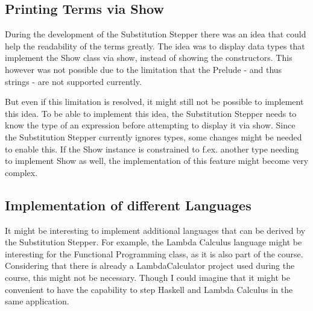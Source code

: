 \subsection{Printing Terms via Show}
During the development of the Substitution Stepper there was an idea that could help the readability of the terms greatly.
The idea was to display data types that implement the Show class via show, instead of showing the constructors.
This however was not possible due to the limitation that the Prelude - and thus strings - are not supported currently.

But even if this limitation is resolved,
it might still not be possible to implement this idea.
To be able to implement this idea,
the Substitution Stepper needs to know the type of an expression before attempting to display it via show.
Since the Substitution Stepper currently ignores types,
some changes might be needed to enable this.
If the Show instance is constrained to f.ex. another type needing to implement Show as well,
the implementation of this feature might become very complex.

\subsection{Implementation of different Languages}
It might be interesting to implement additional languages that can be derived by the Substitution Stepper.
For example,
the Lambda Calculus language might be interesting for the Functional Programming class,
as it is also part of the course.
Considering that there is already a LambdaCalculator project used during the course,
this might not be necessary.
Though I could imagine that it might be convenient to have the capability to step Haskell and Lambda Calculus in the same application.
